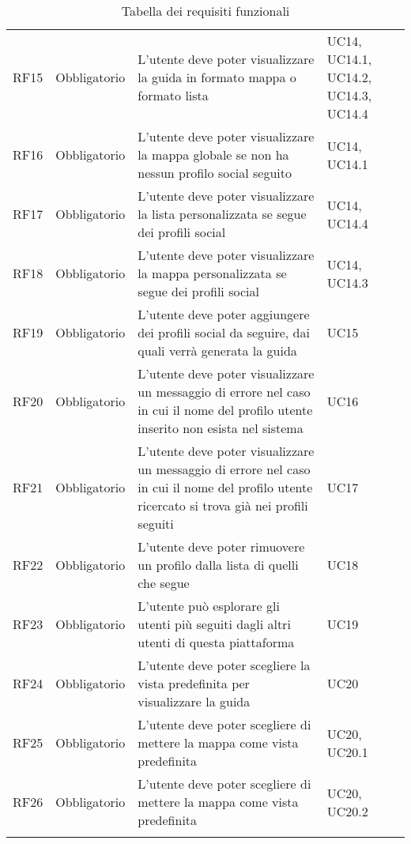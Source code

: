 {\begin{longtable}{C{.257\freewidth} C{.257\freewidth} C{.257\freewidth} C{.257\freewidth}}
      RF15 & Obbligatorio & L'utente deve poter visualizzare la guida in formato mappa o formato lista & UC14, UC14.1, UC14.2, UC14.3, UC14.4 \\
      RF16 & Obbligatorio & L'utente deve poter visualizzare la mappa globale se non ha nessun profilo social seguito & UC14, UC14.1 \\
      RF17 & Obbligatorio & L'utente deve poter visualizzare la lista personalizzata se segue dei profili social & UC14, UC14.4 \\
      RF18 & Obbligatorio & L'utente deve poter visualizzare la mappa personalizzata se segue dei profili social & UC14, UC14.3 \\
      RF19 & Obbligatorio & L'utente deve poter aggiungere dei profili social da seguire, dai quali verrà generata la guida & UC15 \\
      RF20 & Obbligatorio & L'utente deve poter visualizzare un messaggio di errore nel caso in cui il nome del profilo utente inserito non esista nel sistema & UC16 \\
      RF21 & Obbligatorio & L'utente deve poter visualizzare un messaggio di errore nel caso in cui il nome del profilo utente ricercato si trova già nei profili seguiti & UC17 \\
      RF22 & Obbligatorio & L'utente deve poter rimuovere un profilo dalla lista di quelli che segue & UC18 \\
      RF23 & Obbligatorio & L'utente può esplorare gli utenti più seguiti dagli altri utenti di questa piattaforma & UC19 \\
      RF24 & Obbligatorio & L'utente deve poter scegliere la vista predefinita per visualizzare la guida & UC20 \\
      RF25 & Obbligatorio & L'utente deve poter scegliere di mettere la mappa come vista predefinita & UC20, UC20.1 \\
      RF26 & Obbligatorio & L'utente deve poter scegliere di mettere la mappa come vista predefinita & UC20, UC20.2 \\	   
      \bottomrule
      \caption{Tabella dei requisiti funzionali}
      \end{longtable}
}
